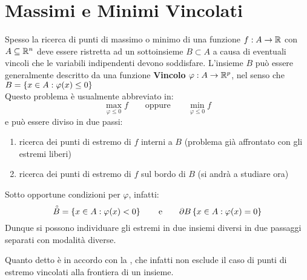 \section{Massimi e Minimi Vincolati}
Spesso la ricerca di punti di massimo o minimo di una funzione $f:A \to \mathbb{R}$ con $A \subseteq \mathbb{R}^n$ deve essere ristretta ad un sottoinsieme $B \subset A$ a causa di eventuali vincoli che le variabili indipendenti devono soddisfare. L'insieme $B$ può essere generalmente descritto da una funzione \textbf{Vincolo} $\varphi: A \to \mathbb{R}^p$, nel senso che $B = \left\{x \in A: \varphi(x) \leq 0\right\}$\\
Questo problema è usualmente abbreviato in:
\[\max\limits_{\varphi \leq 0} f \qquad \text{oppure} \qquad \min\limits_{\varphi \leq 0} f\]
e può essere diviso in due passi:
\begin{enumerate}
	\item ricerca dei punti di estremo di $f$ interni a $B$ (problema già affrontato con gli estremi liberi)
	\item ricerca dei punti di estremo di $f$ sul bordo di $B$ (si andrà a studiare ora)
\end{enumerate}
Sotto opportune condizioni per $\varphi$, infatti:
\[\accentset{\circ}{B} = \left\{x\in A: \varphi(x) < 0\right\} \qquad \text{e} \qquad \partial B\left\{x\in A: \varphi(x) = 0\right\}\]
Dunque si possono individuare gli estremi in due insiemi diversi in due passaggi separati con modalità diverse.
\begin{note}
	Quanto detto è in accordo con la , che infatti non esclude il caso di punti di estremo vincolati alla frontiera di un insieme.
\end{note}
